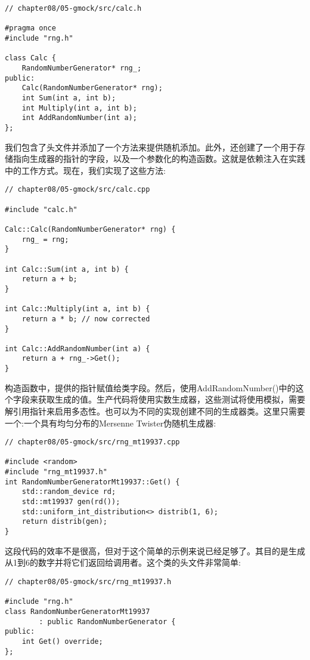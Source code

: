 \begin{lstlisting}[style=styleCXX]
// chapter08/05-gmock/src/calc.h

#pragma once
#include "rng.h"

class Calc {
	RandomNumberGenerator* rng_;
public:
	Calc(RandomNumberGenerator* rng);
	int Sum(int a, int b);
	int Multiply(int a, int b);
	int AddRandomNumber(int a);
};
\end{lstlisting}

我们包含了头文件并添加了一个方法来提供随机添加。此外，还创建了一个用于存储指向生成器的指针的字段，以及一个参数化的构造函数。这就是依赖注入在实践中的工作方式。现在，我们实现了这些方法:

\begin{lstlisting}[style=styleCXX]
// chapter08/05-gmock/src/calc.cpp

#include "calc.h"

Calc::Calc(RandomNumberGenerator* rng) {
	rng_ = rng;
}

int Calc::Sum(int a, int b) {
	return a + b;
}

int Calc::Multiply(int a, int b) {
	return a * b; // now corrected
}

int Calc::AddRandomNumber(int a) {
	return a + rng_->Get();
}
\end{lstlisting}

构造函数中，提供的指针赋值给类字段。然后，使用AddRandomNumber()中的这个字段来获取生成的值。生产代码将使用实数生成器，这些测试将使用模拟，需要解引用指针来启用多态性。也可以为不同的实现创建不同的生成器类。这里只需要一个:一个具有均匀分布的Mersenne Twister伪随机生成器:

\begin{lstlisting}[style=styleCXX]
// chapter08/05-gmock/src/rng_mt19937.cpp

#include <random>
#include "rng_mt19937.h"
int RandomNumberGeneratorMt19937::Get() {
	std::random_device rd;
	std::mt19937 gen(rd());
	std::uniform_int_distribution<> distrib(1, 6);
	return distrib(gen);
}
\end{lstlisting}

这段代码的效率不是很高，但对于这个简单的示例来说已经足够了。其目的是生成从1到6的数字并将它们返回给调用者。这个类的头文件非常简单:

\begin{lstlisting}[style=styleCXX]
// chapter08/05-gmock/src/rng_mt19937.h

#include "rng.h"
class RandomNumberGeneratorMt19937
		: public RandomNumberGenerator {
public:
	int Get() override;
};
\end{lstlisting}

